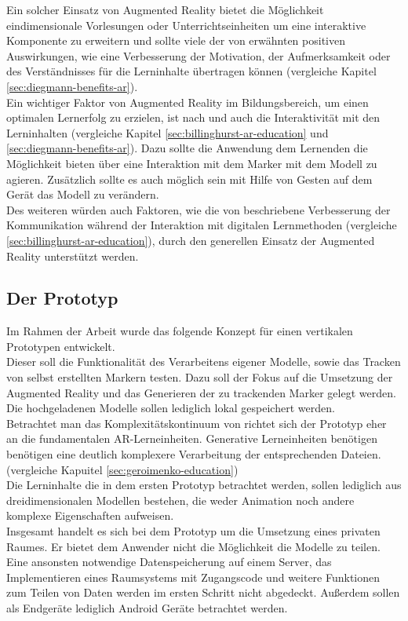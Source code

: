 Ein solcher Einsatz von Augmented Reality bietet die Möglichkeit eindimensionale Vorlesungen oder Unterrichtseinheiten um eine interaktive Komponente zu erweitern und sollte viele der von \citeauthor{diegmann:benefits-ar} erwähnten positiven Auswirkungen, wie eine Verbesserung der  Motivation, der Aufmerksamkeit oder des Verständnisses für die Lerninhalte übertragen können (vergleiche Kapitel \ref{sec:diegmann-benefits-ar}). \\
Ein wichtiger Faktor von Augmented Reality im Bildungsbereich, um einen optimalen Lernerfolg zu erzielen, ist nach \citeauthor{billinghurst:ar-in-education} und \citeauthor{diegmann:benefits-ar} auch die Interaktivität mit den Lerninhalten (vergleiche Kapitel \ref{sec:billinghurst-ar-education} und \ref{sec:diegmann-benefits-ar}). Dazu sollte die Anwendung dem Lernenden die Möglichkeit bieten über eine Interaktion mit dem Marker mit dem Modell zu agieren. Zusätzlich sollte es auch möglich sein mit Hilfe von Gesten auf dem Gerät das Modell zu verändern. \\
Des weiteren würden auch Faktoren, wie die von \citeauthor{billinghurst:ar-in-education} beschriebene Verbesserung der Kommunikation während der Interaktion mit digitalen Lernmethoden (vergleiche \ref{sec:billinghurst-ar-education}), durch den generellen Einsatz der Augmented Reality unterstützt werden. 

\subsection{Der Prototyp}
Im Rahmen der Arbeit wurde das folgende Konzept für einen vertikalen Prototypen entwickelt. \\
Dieser soll die Funktionalität des Verarbeitens eigener Modelle, sowie das Tracken von selbst erstellten Markern testen.
Dazu soll der Fokus auf die Umsetzung der Augmented Reality und das Generieren der zu trackenden Marker gelegt werden. Die hochgeladenen Modelle sollen lediglich lokal gespeichert werden. \\
Betrachtet man das Komplexitätskontinuum von \citeauthor{geroimenko:ar-in-education} richtet sich der Prototyp eher an die fundamentalen AR-Lerneinheiten. Generative Lerneinheiten benötigen benötigen eine deutlich komplexere Verarbeitung der entsprechenden Dateien. (vergleiche Kapuitel \ref{sec:geroimenko-education})\\
Die Lerninhalte die in dem ersten Prototyp betrachtet werden, sollen lediglich aus dreidimensionalen Modellen bestehen, die weder Animation noch andere komplexe Eigenschaften aufweisen.\\
Insgesamt handelt es sich bei dem Prototyp um die Umsetzung eines \glqq privaten Raumes\grqq . Er bietet dem Anwender nicht die Möglichkeit die Modelle zu teilen.\\ 
Eine ansonsten notwendige Datenspeicherung auf einem Server, das Implementieren eines Raumsystems mit Zugangscode und weitere Funktionen zum Teilen von Daten werden im ersten Schritt nicht abgedeckt. Außerdem sollen als Endgeräte lediglich Android Geräte betrachtet werden.

